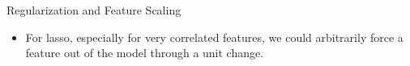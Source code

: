 \documentclass[11pt,compress,t,notes=noshow, xcolor=table]{beamer}
\begin{document}
\begin{vbframe}{Regularization and Feature Scaling}
\begin{itemize}
    \item For lasso, especially for very correlated features, we could arbitrarily force a feature out of the model through a unit change.
\end{itemize}

\framebreak

\end{vbframe}
\end{document}
